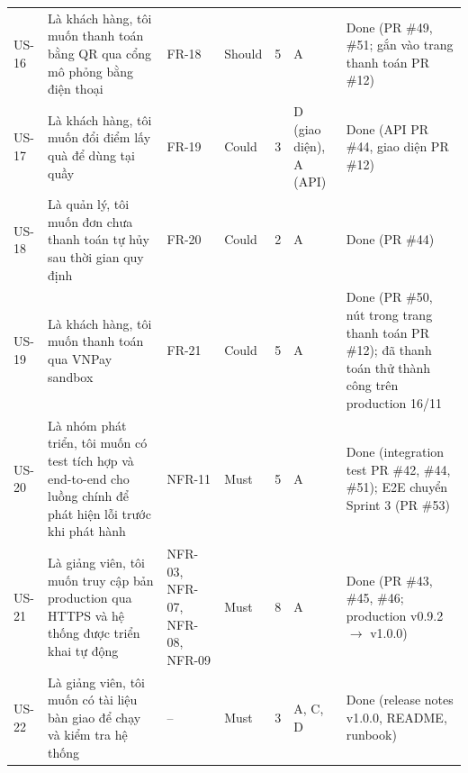 {\begin{longtable}{@{}L{1.1cm}L{4.3cm}L{1.7cm}L{1.6cm}L{0.9cm}L{1.7cm}L{2.6cm}@{}}
US-16 & Là khách hàng, tôi muốn thanh toán bằng QR qua cổng mô phỏng bằng điện thoại & FR-18 & Should & 5 & A & Done (PR \#49, \#51; gắn vào trang thanh toán PR \#12) \\
US-17 & Là khách hàng, tôi muốn đổi điểm lấy quà để dùng tại quầy & FR-19 & Could & 3 & D (giao diện), A (API) & Done (API PR \#44, giao diện PR \#12) \\
US-18 & Là quản lý, tôi muốn đơn chưa thanh toán tự hủy sau thời gian quy định & FR-20 & Could & 2 & A & Done (PR \#44) \\
US-19 & Là khách hàng, tôi muốn thanh toán qua VNPay sandbox & FR-21 & Could & 5 & A & Done (PR \#50, nút trong trang thanh toán PR \#12); đã thanh toán thử thành công trên production 16/11 \\
US-20 & Là nhóm phát triển, tôi muốn có test tích hợp và end-to-end cho luồng chính để phát hiện lỗi trước khi phát hành & NFR-11 & Must & 5 & A & Done (integration test PR \#42, \#44, \#51); E2E chuyển Sprint 3 (PR \#53) \\
US-21 & Là giảng viên, tôi muốn truy cập bản production qua HTTPS và hệ thống được triển khai tự động & NFR-03, NFR-07, NFR-08, NFR-09 & Must & 8 & A & Done (PR \#43, \#45, \#46; production v0.9.2 $\rightarrow$ v1.0.0) \\
US-22 & Là giảng viên, tôi muốn có tài liệu bàn giao để chạy và kiểm tra hệ thống & -- & Must & 3 & A, C, D & Done (release notes v1.0.0, README, runbook) \\
\end{longtable}
}